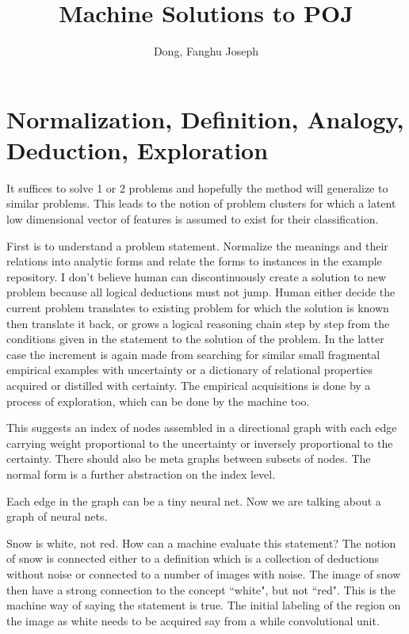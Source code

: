 \documentclass{article}
\title{Machine Solutions to POJ}
\author{Dong, Fanghu Joseph}
\numberwithin{equation}{subsection}
\begin{document}
\maketitle
{}
\section{Normalization, Definition, Analogy, Deduction, Exploration}
	It suffices to solve 1 or 2 problems and hopefully the method will generalize to similar problems. This leads to the notion of problem clusters for which a latent low dimensional vector of features is assumed to exist for their classification.
	
	First is to understand a problem statement. Normalize the meanings and their relations into analytic forms and relate the forms to instances in the example repository. I don't believe human can discontinuously create a solution to new problem because all logical deductions must not jump. Human either decide the current problem translates to existing problem for which the solution is known then translate it back, or grows a logical reasoning chain step by step from the conditions given in the statement to the solution of the problem. In the latter case the increment is again made from searching for similar small fragmental empirical examples with uncertainty or a dictionary of relational properties acquired or distilled with certainty. The empirical acquisitions is done by a process of exploration, which can be done by the machine too.
	
	This suggests an index of nodes assembled in a directional graph with each edge carrying weight proportional to the uncertainty or inversely proportional to the certainty. There should also be meta graphs between subsets of nodes. The normal form is a further abstraction on the index level.
	
	Each edge in the graph can be a tiny neural net. Now we are talking about a graph of neural nets.
	
	Snow is white, not red. How can a machine evaluate this statement? The notion of snow is connected either to a definition which is a collection of deductions without noise or connected to a number of images with noise. The image of snow then have a strong connection to the concept ``white", but not ``red". This is the machine way of saying the statement is true. The initial labeling of the region on the image as white needs to be acquired say from a while convolutional unit. 
	
\end{document}

